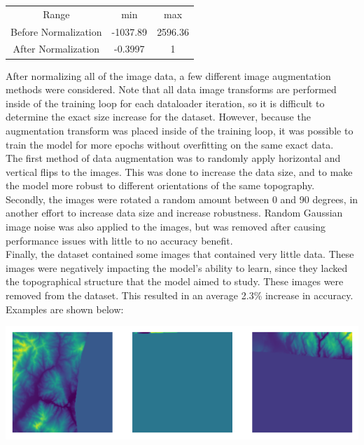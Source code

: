\documentclass{article}[12pt]
\begin{document}
\begin{center}
    \begin{tabular}{|c|c|c|}
        Range & min & max \\
        Before Normalization & -1037.89 & 2596.36 \\
        After Normalization & -0.3997 & 1 \\
    \end{tabular}
\end{center}

\indent
After normalizing all of the image data, a few different image augmentation methods were considered. Note that all data image transforms are performed inside of the training loop for each dataloader iteration, so it is difficult to determine the exact size increase for the dataset. However, because the augmentation transform was placed inside of the training loop, it was possible to train the model for more epochs without overfitting on the same exact data.\\
\indent
The first method of data augmentation was to randomly apply horizontal and vertical flips to the images. This was done to increase the data size, and to make the model more robust to different orientations of the same topography.\\
\indent
Secondly, the images were rotated a random amount between 0 and 90 degrees, in another effort to increase data size and increase robustness. Random Gaussian image noise was also applied to the images, but was removed after causing performance issues with little to no accuracy benefit.\\
\indent
Finally, the dataset contained some images that contained very little data. These images were negatively impacting the model's ability to learn, since they lacked the topographical structure that the model aimed to study. These images were removed from the dataset. This resulted in an average 2.3\% increase in accuracy. Examples are shown below:\\

\begin{center}
    \includegraphics[width=1\textwidth]{images/low_data.png}
\end{center}
\end{document}
